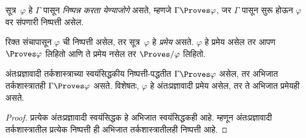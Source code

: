 \begin{defn}[निष्पन्नता]
सूत्र~$\varphi$ हे $\Gamma$ पासून \emph{निष्पन्न करता येण्याजोगे}
असते, म्हणजे $\Gamma \Proves \varphi$, जर $\Gamma$
पासून सुरू होऊन $\varphi$ वर संपणारी निष्पत्ती असेल.
\end{defn}
\begin{defn}[प्रमेये]
रिक्त संचापासून $\varphi$ ची निष्पत्ती असेल,
तर सूत्र~$\varphi$ हे \emph{प्रमेय} असते.
$\varphi$ हे प्रमेय असेल तर आपण $\Proves \varphi$ लिहितो
आणि ते प्रमेय नसेल तर $\Proves/ \varphi$ लिहितो.
\end{defn}
\begin{prop}
  अंतःप्रज्ञावादी तर्कशास्त्राच्या स्वयंसिद्धकीय
  निष्पत्ती-पद्धतीत $\Gamma \Proves \varphi$
  असेल, तर अभिजात तर्कशास्त्रातही
  $\Gamma \Proves \varphi$ असते. विशेषतः, $\varphi$ हे
  अंतःप्रज्ञावादी प्रमेय असेल, तर ते अभिजात प्रमेयही असते.
\end{prop}
\begin{proof}
  प्रत्येक अंतःप्रज्ञावादी स्वयंसिद्धक हे अभिजात
  स्वयंसिद्धकही आहे. म्हणून अंतःप्रज्ञावादी
  तर्कशास्त्रातील प्रत्येक निष्पत्ती ही अभिजात
  तर्कशास्त्रातीलही निष्पत्ती आहे.
\end{proof}
